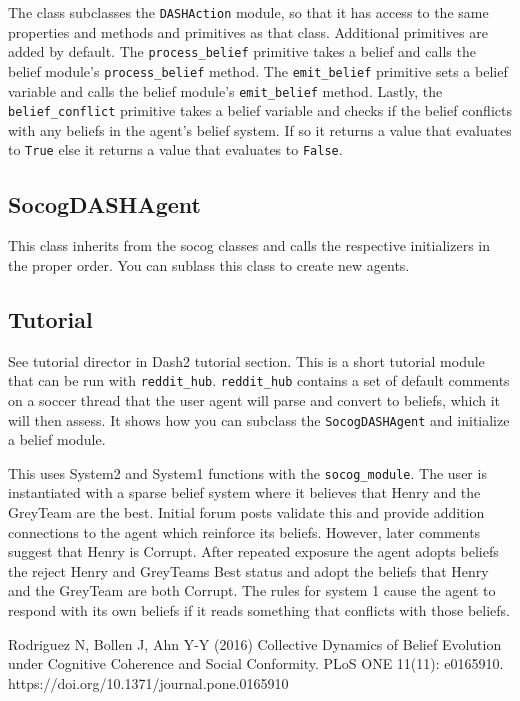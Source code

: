 \documentclass[11pt, a4paper]{article}
\begin{document}
The class subclasses the \texttt{DASHAction} module, so that it has access to the same properties and methods and primitives as that class. Additional primitives are added by default. The \texttt{process\_belief} primitive takes a belief and calls the belief module's \texttt{process\_belief} method. The \texttt{emit\_belief} primitive sets a belief variable and calls the belief module's \texttt{emit\_belief} method. Lastly, the \texttt{belief\_conflict} primitive takes a belief variable and checks if the belief conflicts with any beliefs in the agent's belief system. If so it returns a value that evaluates to \texttt{True} else it returns a value that evaluates to \texttt{False}.

\subsection{SocogDASHAgent}

This class inherits from the socog classes and calls the respective initializers in the proper order. You can sublass this class to create new agents.

\subsection{Tutorial}
See tutorial director in Dash2 tutorial section. This is a short tutorial module that can be run with \texttt{reddit\_hub}. \texttt{reddit\_hub} contains a set of default comments on a soccer thread that the user agent will parse and convert to beliefs, which it will then assess. It shows how you can subclass the \texttt{SocogDASHAgent} and initialize a belief module.

This uses System2 and System1 functions with the \texttt{socog\_module}. The user is instantiated with a sparse belief system where it believes that Henry and the GreyTeam are the best. Initial forum posts validate this and provide addition connections to the agent which reinforce its beliefs. However, later comments suggest that Henry is Corrupt. After repeated exposure the agent adopts beliefs the reject Henry and GreyTeams Best status and adopt the beliefs that Henry and the GreyTeam are both Corrupt. The rules for system 1 cause the agent to respond with its own beliefs if it reads something that conflicts with those beliefs.



\begin{thebibliography}{1}
 Rodriguez N, Bollen J, Ahn Y-Y (2016) Collective Dynamics of Belief Evolution under Cognitive Coherence and Social Conformity. PLoS ONE 11(11): e0165910. https://doi.org/10.1371/journal.pone.0165910
\end{thebibliography}
\end{document}
